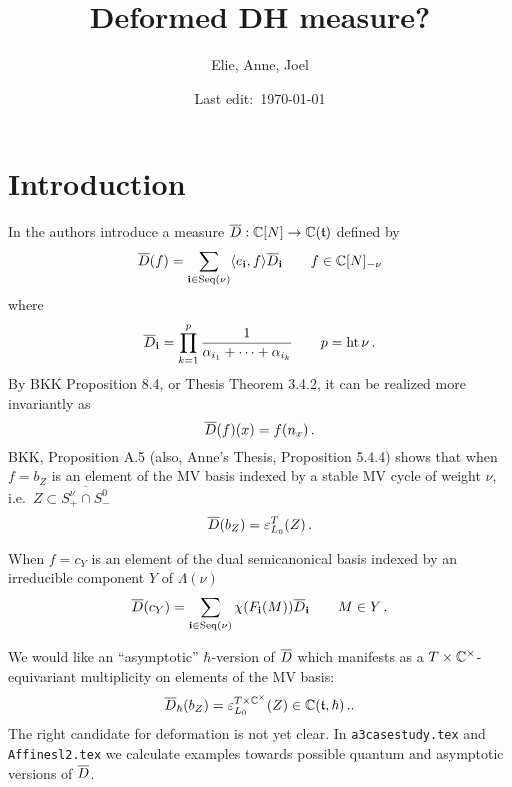 \documentclass[11pt]{article}
\title{Deformed DH measure?}
\author{Elie, Anne, Joel}
\date{Last edit:~\today}
\begin{document}
% 
\maketitle
% 
\section*{Introduction}
% 
In \cite{baumann2019mirkovic} the authors introduce a measure $\overline{D}:\mathbb C[N]\to\mathbb C(\mathfrak t)$ defined by 
\begin{equation}
    \label{eq:defbard}
    \overline{D}(f) = \sum_{\mathbf{i}\in\operatorname{Seq}(\nu)}\langle e_{\mathbf{i}},f\rangle\overline{D}_{\mathbf{i}}\qquad f \in \mathbb C[N]_{-\nu}
\end{equation}
where 
\begin{equation}
    \label{eq:bardi}
    \overline{D}_{\mathbf{i}} = \prod_{k=1}^p\frac{1}{\alpha_{i_1} + \cdots + \alpha_{i_k}} \qquad p = \operatorname{ht} \nu \,.
\end{equation}
By BKK Proposition 8.4, or Thesis Theorem 3.4.2, it can be realized more invariantly as 
\begin{equation}
    \label{eq:invbard}
     \overline{D}(f)(x) = f(n_x)\,.
\end{equation}
% 
BKK, Proposition A.5 (also, Anne's Thesis, Proposition 5.4.4) shows that when $f = b_Z$ is an element of the MV basis indexed by a stable MV cycle of weight $\nu$, i.e.\ $Z\subset \overline{S^\nu_+\cap S^0_-}$
\begin{equation}
    \label{eq:bardaseqm}
    \overline{D}(b_Z) = \varepsilon_{L_0}^T (Z) \,. 
\end{equation}

When $f = c_Y$ is an element of the dual semicanonical basis indexed by an irreducible component $Y$ of $\Lambda(\nu)$
\begin{equation}
    \label{eq:bardaseu} %
    \barD(c_Y) = \sum_{\vi\in\Seq(\nu)}\chi(F_{\vi}(M))\barD_{\vi} \qquad M \in Y\,. 
\end{equation}

We would like an ``asymptotic'' $\hbar$-version of $\overline{D}$ which manifests as a $T\times\mathbb C^\times$-equivariant multiplicity on elements of the MV basis:
$$
\overline{D}_\hbar(b_Z) = \varepsilon_{L_0}^{T\times\mathbb C^\times} (Z) \in \mathbb C(\mathfrak t,\hbar)\,..
$$
% 
The right candidate for deformation is not yet clear. In \texttt{a3casestudy.tex} and \texttt{Affinesl2.tex} we calculate examples towards possible quantum and asymptotic versions of $\overline{D}$.
\end{document}
